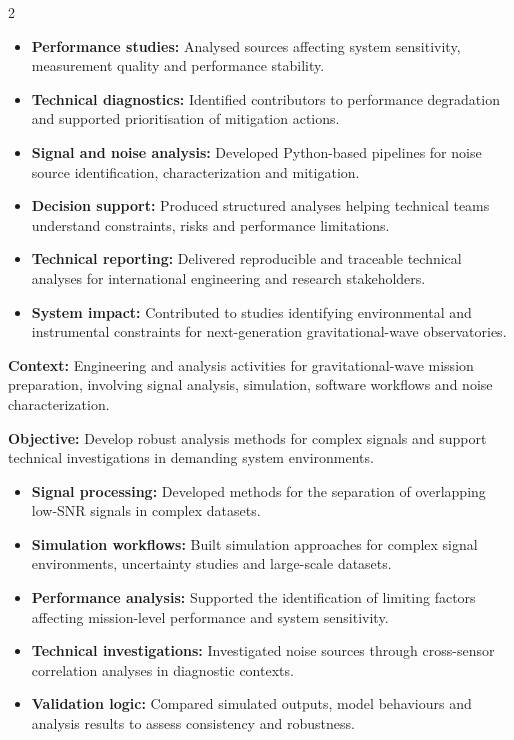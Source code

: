 \documentclass[8pt,a4paper,ragged2e,withhyper]{altacv}
\begin{document}
\begin{paracol}{2}
\begin{itemize}
  \item \textbf{Performance studies:} Analysed sources affecting system sensitivity, measurement quality and performance stability.
  \item \textbf{Technical diagnostics:} Identified contributors to performance degradation and supported prioritisation of mitigation actions.
  \item \textbf{Signal and noise analysis:} Developed Python-based pipelines for noise source identification, characterization and mitigation.
  \item \textbf{Decision support:} Produced structured analyses helping technical teams understand constraints, risks and performance limitations.
  \item \textbf{Technical reporting:} Delivered reproducible and traceable technical analyses for international engineering and research stakeholders.
  \item \textbf{System impact:} Contributed to studies identifying environmental and instrumental constraints for next-generation gravitational-wave observatories.
\end{itemize}

\divider


\textbf{Context:} Engineering and analysis activities for gravitational-wave mission preparation, involving signal analysis, simulation, software workflows and noise characterization.

\textbf{Objective:} Develop robust analysis methods for complex signals and support technical investigations in demanding system environments.

\begin{itemize}
  \item \textbf{Signal processing:} Developed methods for the separation of overlapping low-SNR signals in complex datasets.
  \item \textbf{Simulation workflows:} Built simulation approaches for complex signal environments, uncertainty studies and large-scale datasets.
  \item \textbf{Performance analysis:} Supported the identification of limiting factors affecting mission-level performance and system sensitivity.
  \item \textbf{Technical investigations:} Investigated noise sources through cross-sensor correlation analyses in diagnostic contexts.
  \item \textbf{Validation logic:} Compared simulated outputs, model behaviours and analysis results to assess consistency and robustness.
\end{itemize}


\end{paracol}
\end{document}
